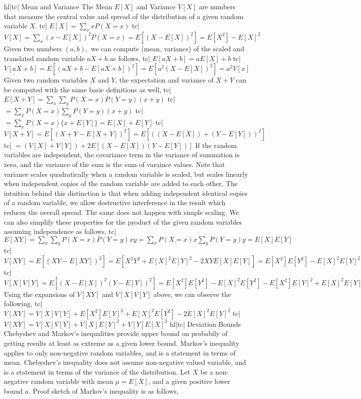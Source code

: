 hl|tc| Mean and Variance
The Mean \(E[X]\) and Variance \(V[X]\) are numbers that measure the central value and spread of the distribution of a given random variable \(X\).
tc| \(E[X]=\sum_x xP(X=x)\)
tc| \(V[X] = \sum_x (x - E[X])^2 P(X=x) = E[(X-E[X])^2] = E[X^2] - E[X]^2 \)
Given two numbers \((a, b),\) we can compute (mean, variance) of the scaled and translated random variable \(aX+b\) as follows,
tc| \(E[aX+b] = aE[X]+b\)
tc| \(V[aX+b] = E[(aX+b-E[aX+b])^2] = E[a^2(X-E[X])^2] = a^2V[x]\)
Given two random variables \(X\) and \(Y\), the expectation and variance of \(X+Y\) can be computed with the same basic definitions as well,
tc| \( E[X+Y] = \sum_x \sum_y P(X=x) P(Y=y) (x+y)\)
tc| \( = \sum_x P(X=x) \sum_y P(Y=y) (x+y) \)
tc| \( = \sum_x P(X=x) \{x + E[Y]\} = E[X] + E[Y] \)
tc| \( V[X+Y] = E[(X+Y - E[X+Y])^2] = E[((X-E[X])+(Y-E[Y]))^2] \)
tc| \(= (V[X] + V[Y]) + 2E[(X-E[X])(Y-E[Y])] \)
If the random variables are independent, the covariance term in the variance of summation is zero, and the variance of the sum is the sum of varaince values. Note that variance scales quadratically when a random variable is scaled, but scales linearly when independent copies of the random variable are added to each other. The intuition behind this distinction is that when adding independent identical copies of a random variable, we allow destructive interference in the result which reduces the overall spread. The same does not happen with simple scaling.
We can also simplify these properties for the product of the given random variables assuming independence as follows,
tc| \( E[XY] = \sum_x \sum_y P(X=x)P(Y=y) xy = \sum_x P(X=x)x \sum_y P(Y=y)y = E[X]E[Y] \)
tc| \( V[XY] = E\left[ (XY-E[XY])^2 \right] = E\left[X^2Y^2 + E[X]^2 E[Y]^2 - 2XYE[X]E[Y] \right] = E[X^2]E[Y^2] - E[X]^2E[Y]^2 \)
tc| \( V[X]V[Y] = E\left[(X-E[X])^2(Y-E[Y])^2 \right] = E[X^2]E[Y^2] - E[X]^2E[Y^2] - E[X^2]E[Y]^2 + E[X]^2E[Y]^2 \)
Using the expansions of \(V[XY]\) and \(V[X]V[Y]\) above, we can observe the following,
tc| \( V[XY] = V[X]V[Y] + E[X^2]E[Y]^2 + E[X]^2E[Y^2] - 2E[X]^2E[Y]^2 \)
tc| \( V[XY] = V[X]V[Y] + V[X]E[Y]^2 + V[Y]E[X]^2 \)
hl|tc| Deviation Bounds
Chebyshev and Markov's inequalities provide upper bound on probabily of getting results at least as extreme as a given lower bound. Markov's inequality applies to only non-negative random variables, and is a statement in terms of mean. Chebyshev's inequality does not assume non-negative valued variable, and is a statement in terms of the variance of the distribution.
Let \(X\) be a non-negative random variable with mean \(\mu=E[X]\), and a given positive lower bound \(a\). Proof sketch of Markov's inequality is as follows,
